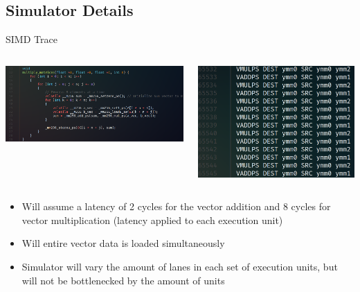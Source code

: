 \documentclass{beamer}
\begin{document}
\subsection{Simulator Details}
\begin{frame}{SIMD Trace}
    \begin{columns}[T]
        \begin{column}{0.7\textwidth}
            \includegraphics[scale=.225]{mm.png}\\
        \end{column}
        \begin{column}{0.5\textwidth}
            \includegraphics[scale=.2]{trace.png}
        \end{column}
    \end{columns}
    \begin{itemize}
        \item Will assume a latency of 2 cycles for the vector addition and 8 cycles
            for vector multiplication (latency applied to each execution unit)
        \item Will entire vector data is loaded simultaneously
        \item Simulator will vary the amount of lanes in each set of execution units, but 
            will not be bottlenecked by the amount of units
    \end{itemize}
\end{frame}
\end{document}
